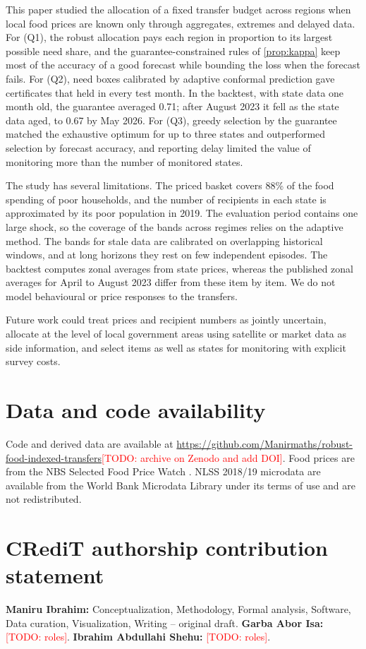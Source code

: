 \documentclass[preprint,12pt,number]{elsarticle}%
\theoremstyle{definition}
\theoremstyle{remark}
\newcommand{\todo}[1]{\textcolor{red}{[TODO: #1]}}
\begin{document}
This paper studied the allocation of a fixed transfer budget across regions when local food prices are known only through aggregates, extremes and delayed data. For (Q1), the robust allocation pays each region in proportion to its largest possible need share, and the guarantee-constrained rules of \cref{prop:kappa} keep most of the accuracy of a good forecast while bounding the loss when the forecast fails. For (Q2), need boxes calibrated by adaptive conformal prediction gave certificates that held in every test month. In the backtest, with state data one month old, the guarantee averaged 0.71; after August 2023 it fell as the state data aged, to 0.67 by May 2026. For (Q3), greedy selection by the guarantee matched the exhaustive optimum for up to three states and outperformed selection by forecast accuracy, and reporting delay limited the value of monitoring more than the number of monitored states.

The study has several limitations. The priced basket covers 88\% of the food spending of poor households, and the number of recipients in each state is approximated by its poor population in 2019. The evaluation period contains one large shock, so the coverage of the bands across regimes relies on the adaptive method. The bands for stale data are calibrated on overlapping historical windows, and at long horizons they rest on few independent episodes. The backtest computes zonal averages from state prices, whereas the published zonal averages for April to August 2023 differ from these item by item. We do not model behavioural or price responses to the transfers.

Future work could treat prices and recipient numbers as jointly uncertain, allocate at the level of local government areas using satellite or market data as side information, and select items as well as states for monitoring with explicit survey costs.

\section*{Data and code availability}
Code and derived data are available at \url{https://github.com/Manirmaths/robust-food-indexed-transfers}\todo{archive on Zenodo and add DOI}. Food prices are from the NBS Selected Food Price Watch \citep{nbs2026econs}. NLSS 2018/19 microdata \citep{nlss2019} are available from the World Bank Microdata Library under its terms of use and are not redistributed.

\section*{CRediT authorship contribution statement}
\textbf{Maniru Ibrahim:} Conceptualization, Methodology, Formal analysis, Software, Data curation, Visualization, Writing -- original draft. \textbf{Garba Abor Isa:} \todo{roles}. \textbf{Ibrahim Abdullahi Shehu:} \todo{roles}.
\end{document}
